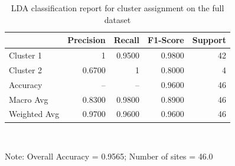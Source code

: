 \begin{table}[htbp]
  \centering
  \caption{LDA classification report for cluster assignment on the full dataset}
  \label{tab:03_LDA_Classification_lda_classification_report}
  \begin{tabular}{lrrrr}
    \toprule
     & Precision & Recall & F1-Score & Support \\
    \midrule
    Cluster 1 & 1 & 0.9500 & 0.9800 & 42 \\
    Cluster 2 & 0.6700 & 1 & 0.8000 & 4 \\
    Accuracy & – & – & 0.9600 & 46 \\
    Macro Avg & 0.8300 & 0.9800 & 0.8900 & 46 \\
    Weighted Avg & 0.9700 & 0.9600 & 0.9600 & 46 \\
    \bottomrule
  \end{tabular}
  \\[4pt]
  \parbox{\textwidth}{\footnotesize Note: Overall Accuracy = 0.9565; Number of sites = 46.0}
\end{table}
